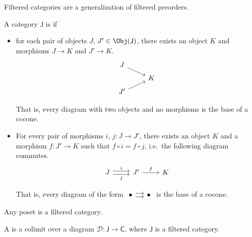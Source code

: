 \documentclass[notes.tex]{subfiles}
\begin{document}
Filtered categories are a generalization of filtered preorders.

\begin{definition}
  \label{def:filteredcategory}
  A category $\mathsf{J}$ is  if
  \begin{itemize}
    \item for each pair of objects $J$, $J' \in \Obj(\mathsf{J})$, there exists an object $K$ and morphisms $J \to K$ and $J' \to K$.
      \begin{equation*}
        \begin{tikzcd}[row sep=tiny]
          J
          \arrow[dr]
          \\
          & K
          \\
          J'
          \arrow[ur]
        \end{tikzcd}
      \end{equation*}

      That is, every diagram with two objects and no morphisms is the base of a cocone.

    \item For every pair of morphisms $i$, $j\colon J \to J'$, there exists an object $K$ and a morphism $f\colon J' \to K$ such that $f \circ i = f \circ j$, i.e.\ the following diagram commutes.
      \begin{equation*}
        \begin{tikzcd}[row sep=tiny]
          J
          \arrow[r, shift left, "i"]
          \arrow[r, shift right, swap, "j"]
          & J'
          \arrow[r, "f"]
          & K
        \end{tikzcd}
      \end{equation*}

      That is, every diagram of the form $\begin{tikzcd}[column sep=small]\bullet \arrow[r, shift left] \arrow[r, shift right] & \bullet \end{tikzcd}$ is the base of a cocone.
  \end{itemize}
\end{definition}

\begin{example}
  Any poset is a filtered category.
\end{example}

\begin{definition}
  \label{def:filteredcolimit}
  A  is a colimit over a diagram $\mathcal{D}\colon \mathsf{J} \to \mathsf{C}$, where $\mathsf{J}$ is a filtered category.
\end{definition}
\end{document}
